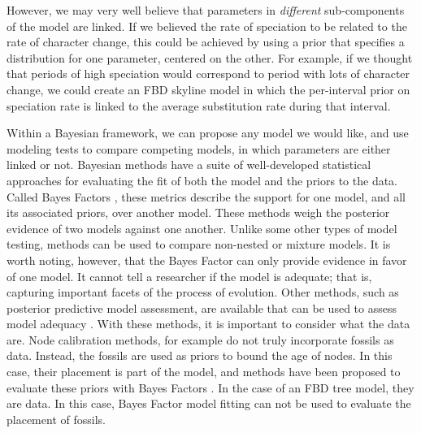 \documentclass[11pt]{article}
\newcommand{\edit}[1]{{\textcolor{red}{#1}}} %
\begin{document}
However, we may very well believe that parameters in \textit{different} sub-components of the model are linked. 
If we believed the rate of speciation to be related to the rate of character change,  
this could be achieved by using a prior that specifies a distribution for one parameter, centered on the other. 
For example, if we thought that periods of high speciation would correspond to period with lots of character change, we could create an FBD skyline model in which the per-interval prior on speciation rate is linked to the average substitution rate during that interval.


Within a Bayesian framework, we can propose any model we would like, and use modeling tests to compare competing models, in which parameters are either linked or not.
Bayesian methods have a suite of well-developed statistical approaches for evaluating the fit of both the model and the priors to the data.
Called Bayes Factors \cite{Xie2011}, these metrics describe the support for one model, and all its associated priors, over another model. 
These methods weigh the posterior evidence of two models against one another. 
Unlike some other types of model testing, methods can be used to compare non-nested or mixture models.
It is worth noting, however, that the Bayes Factor can only provide evidence in favor of one model.
It cannot tell a researcher if the model is adequate; that is, capturing important facets of the process of evolution.
Other methods, such as posterior predictive model assessment, are available that can be used to assess model adequacy \cite{Brown2009, Brown2014}.
With these methods, it is important to consider what the data are.
Node calibration methods, for example do not truly incorporate fossils as data.
Instead, the fossils are used as priors to bound the age of nodes.
In this case, their placement is part of the model, and methods have been proposed to evaluate these priors with Bayes Factors \cite{Andujar2014}. %
In the case of an FBD tree model, they are data.
In this case, Bayes Factor model fitting can not be used to evaluate the placement of fossils.
\end{document}
